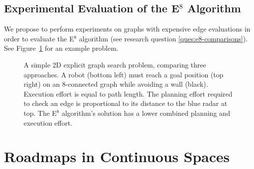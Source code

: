 \subsection{Experimental Evaluation of the E$^8$ Algorithm}

We propose to perform experiments on graphs with
expensive edge evaluations
in order to evaluate the E$^8$ algorithm
(see research question \ref{ques:e8-comparisons}).
See Figure~\ref{fig:e8-results} for an example problem.

\begin{figure}[t]
   \centering
   
   
   
   
   \quad
   \subfloat[A$^*$ search.
         Planning Effort: 692.3 %
         Execution Effort: 14.2 %
   ]{
      \texttt{[image: build/e8-world-astar]}
   }
   \vspace{0.05in}
   \subfloat[Weighted A$^*$ search, $\epsilon=3$
         Planning Effort: 390.8 %
         Execution Effort: 18.5 %
   ]{
      \texttt{[image: build/e8-world-wastar]}
   }
   \quad
   \subfloat[E$^8$ search, $\lambda=0.5$
         Planning Effort: 358.8 %
         Execution Effort: 20.5 %
   ]{
      \texttt{[image: build/e8-world-e8]}
   }
   
   \caption{A simple 2D explicit graph search problem,
      comparing three approaches.
      A robot (bottom left) must reach a goal position (top right)
      on an 8-connected graph
      while avoiding a wall (black).
      Execution effort is equal to path length.
      The planning effort required to check an edge is proportional
      to its distance to the blue radar at top.
      The E$^8$ algorithm's solution has a lower combined
      planning and execution effort.}
   \label{fig:e8-results}
\end{figure}

\section{Roadmaps in Continuous Spaces}
\label{chap:graphs-in-continuous}

